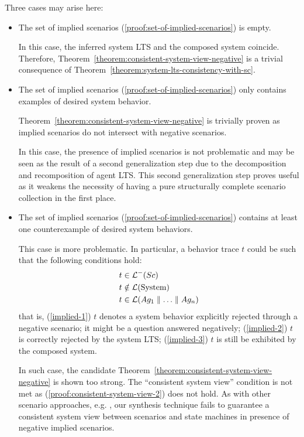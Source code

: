 Three cases may arise here:
\begin{itemize}
\item The set of implied scenarios (\ref{proof:set-of-implied-scenarios}) is empty. 

In this case, the inferred system LTS and the composed system coincide. Therefore, Theorem~\ref{theorem:consistent-system-view-negative} is a trivial consequence of Theorem~\ref{theorem:system-lts-consistency-with-sc}.

\item The set of implied scenarios (\ref{proof:set-of-implied-scenarios}) only contains examples of desired system behavior.

Theorem~\ref{theorem:consistent-system-view-negative} is trivially proven as implied scenarios do not intersect with negative scenarios. 

In this case, the presence of implied scenarios is not problematic and may be seen as the result of a second generalization step due to the decomposition and recomposition of agent LTS. This second generalization step proves useful as it weakens the necessity of having a pure structurally complete scenario collection in the first place.

\item The set of implied scenarios (\ref{proof:set-of-implied-scenarios}) contains at least one counterexample of desired system behaviors. 

This case is more problematic. In particular, a behavior trace $t$ could be such that the following conditions hold:
\begin{align}
&t \in \mathcal{L}^-(Sc)\label{implied-1}\\
&t \notin \mathcal{L}(\mbox{System})\label{implied-2}\\
&t \in \mathcal{L}(Ag_1 \parallel \ldots \parallel Ag_n)\label{implied-3}
\end{align}
that is, (\ref{implied-1}) $t$ denotes a system behavior explicitly rejected through a negative scenario; it might be a question answered negatively; (\ref{implied-2}) $t$ is correctly rejected by the system LTS; (\ref{implied-3}) $t$ is still be exhibited by the composed system.

In such case, the candidate Theorem~\ref{theorem:consistent-system-view-negative} is shown too strong.  The ``consistent system view'' condition is not met as (\ref{proof:consistent-system-view-2}) does not hold. As with other scenario approaches, e.g. \cite{Alur:2000, Uchitel:2004}, our synthesis technique fails to guarantee a consistent system view between scenarios and state machines in presence of negative implied scenarios.


\end{itemize}
